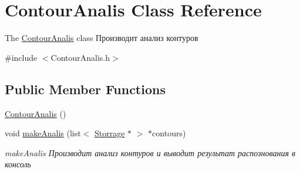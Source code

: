 \hypertarget{class_contour_analis}{\section{Contour\+Analis Class Reference}
\label{class_contour_analis}
}


The \hyperlink{class_contour_analis}{Contour\+Analis} class Производит анализ контуров  




{\ttfamily \#include $<$Contour\+Analis.\+h$>$}

\subsection*{Public Member Functions}
\begin{DoxyCompactItemize}
\item 
\hyperlink{class_contour_analis_afb230c8f15afd848b467916f16c1681a}{Contour\+Analis} ()
\item 
void \hyperlink{class_contour_analis_a8c398a82aced99e9e44b378743652a90}{make\+Analis} (list$<$ \hyperlink{class_storrage}{Storrage} $\ast$ $>$ $\ast$contours)
\begin{DoxyCompactList}\small\item\em make\+Analis Производит анализ контуров и выводит результат распознования в консоль \end{DoxyCompactList}\end{DoxyCompactItemize}
